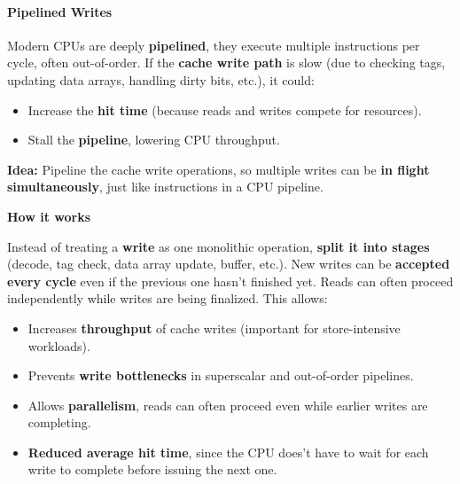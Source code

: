\paragraph{Pipelined Writes}

Modern CPUs are deeply \textbf{pipelined}, they execute multiple instructions per cycle, often out-of-order. If the \textbf{cache write path} is slow (due to checking tags, updating data arrays, handling dirty bits, etc.), it could:
\begin{itemize}
    \item Increase the \textbf{hit time} (because reads and writes compete for resources).
    \item Stall the \textbf{pipeline}, lowering CPU throughput.
\end{itemize}
\textbf{Idea:} Pipeline the cache write operations, so multiple writes can be \textbf{in flight simultaneously}, just like instructions in a CPU pipeline.

\highspace
\begin{flushleft}
    \textcolor{Green3}{ \textbf{How it works}}
\end{flushleft}
Instead of treating a \textbf{write} as one monolithic operation, \textbf{split it into stages} (decode, tag check, data array update, buffer, etc.). New writes can be \textbf{accepted every cycle} even if the previous one hasn't finished yet. Reads can often proceed independently while writes are being finalized. This allows:
\begin{itemize}
    \item[\textcolor{Green3}{\faIcon{check}}] Increases \textbf{throughput} of cache writes (important for store-intensive workloads).
    \item[\textcolor{Green3}{\faIcon{check}}] Prevents \textbf{write bottlenecks} in superscalar and out-of-order pipelines.
    \item[\textcolor{Green3}{\faIcon{check}}] Allows \textbf{parallelism}, reads can often proceed even while earlier writes are completing.
    \item[\textcolor{Green3}{\faIcon{check}}] \textbf{Reduced average hit time}, since the CPU does't have to wait for each write to complete before issuing the next one.
\end{itemize}

